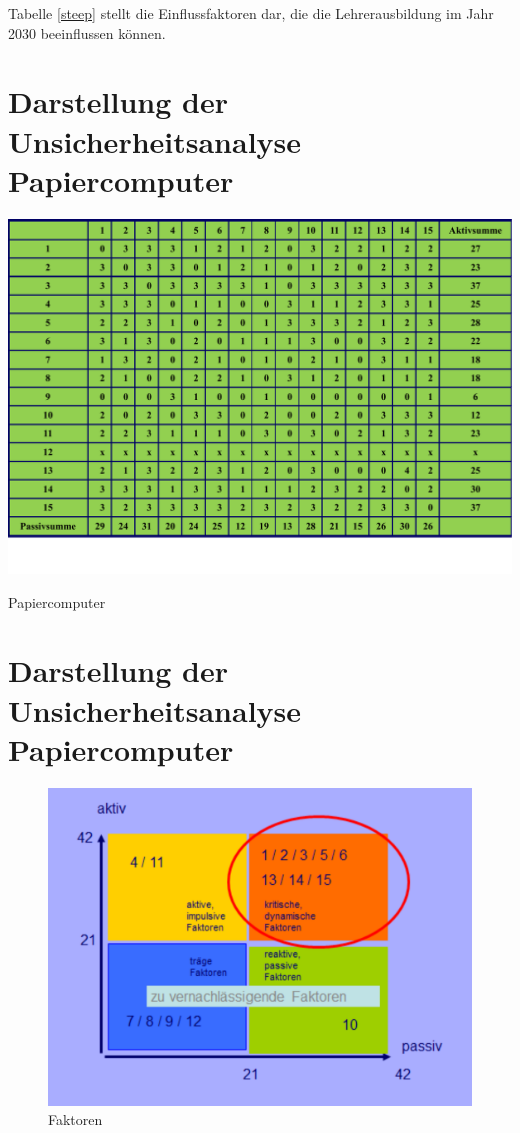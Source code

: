 \documentclass[12pt,a4paper]{article}
\begin{document}
Tabelle \ref{steep} stellt die Einflussfaktoren dar, die die Lehrerausbildung im Jahr 2030 beeinflussen können.

\section{Darstellung der Unsicherheitsanalyse Papiercomputer}
\begin{table}[!ht]
\includegraphics[scale=1.0,angle=90]{tabelle.pdf}
\caption{Papiercomputer}
\label{tabelle}
\end{table}

\section{Darstellung der Unsicherheitsanalyse Papiercomputer}
\begin{figure}[!ht]
\includegraphics[scale=1.1,angle=90]{faktoren.pdf}
\caption{Faktoren}
\label{faktoren}
\end{figure}
\end{document}
